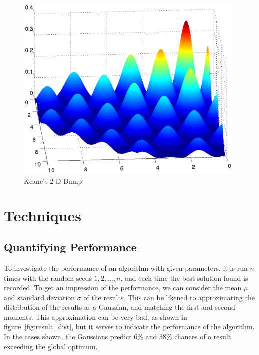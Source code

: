\documentclass[10pt]{article}
\begin{document}
\begin{figure}
  \begin{center}
    \includegraphics[height=9cm]{bump_3d_smooth.eps}
    \end{center}
    \caption{Keane's 2-D Bump}
    \label{fig:bump_3d}
    \end{figure}

\section{Techniques}

\subsection{Quantifying Performance}

\label{sec:quant_perf}

To investigate the performance of an algorithm with given parameters, it is
run $n$ times with the random seeds $1, 2, \dots, n$, and each time the best
solution found is recorded. To get an impression of the performance, we can
consider the mean $\mu$ and standard deviation $\sigma$ of the results. This
can be likened to approximating the distribution of the results as a Gaussian,
and matching the first and second moments. This approximation can be very bad,
as shown in figure~\ref{fig:result_dist}, but it serves to indicate the
performance of the algorithm. In the cases shown, the Gaussians predict 6\%
and 38\% chances of a result exceeding the global optimum.
\end{document}
